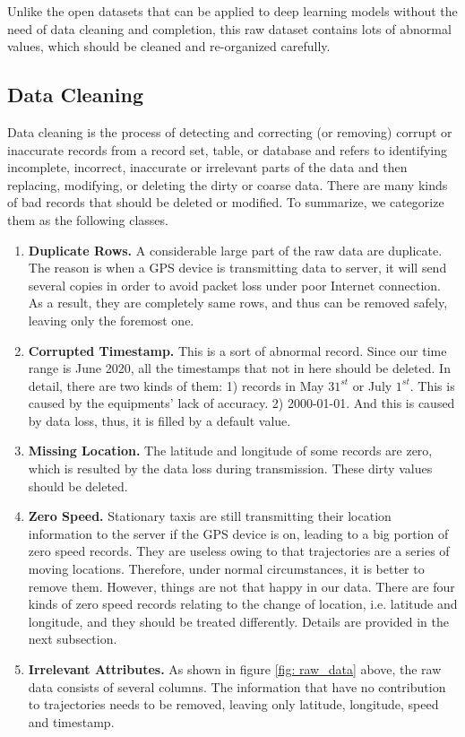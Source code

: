 Unlike the open datasets that can be applied to deep learning models without the need of data cleaning and completion, this raw dataset contains lots of abnormal values, which should be cleaned and re-organized carefully.

\subsection{Data Cleaning}
Data cleaning is the process of detecting and correcting (or removing) corrupt or inaccurate records from a record set, table, or database and refers to identifying incomplete, incorrect, inaccurate or irrelevant parts of the data and then replacing, modifying, or deleting the dirty or coarse data\cite{data_cleaning}. There are many kinds of bad records that should be deleted or modified. To summarize, we categorize them as the following classes.

\begin{enumerate}
  \item \textbf{Duplicate Rows.} A considerable large part of the raw data are duplicate. The reason is when a GPS device is transmitting data to server, it will send several copies in order to avoid packet loss under poor Internet connection. As a result, they are completely same rows, and thus can be removed safely, leaving only the foremost one.
  \item \textbf{Corrupted Timestamp.} This is a sort of abnormal record. Since our time range is June 2020, all the timestamps that not in here should be deleted. In detail, there are two kinds of them: 1) records in May $31^{st}$ or July $1^{st}$. This is caused by the equipments' lack of accuracy. 2) 2000-01-01. And this is caused by data loss, thus, it is filled by a default value.
  \item \textbf{Missing Location.} The latitude and longitude of some records are zero, which is resulted by the data loss during transmission. These dirty values should be deleted.
  \item \textbf{Zero Speed.} Stationary taxis are still transmitting their location information to the server if the GPS device is on, leading to a big portion of zero speed records. They are useless owing to that trajectories are a series of moving locations. Therefore, under normal circumstances, it is better to remove them. However, things are not that happy in our data. There are four kinds of zero speed records relating to the change of location, i.e. latitude and longitude, and they should be treated differently. Details are provided in the next subsection.
  \item \textbf{Irrelevant Attributes.} As shown in figure \ref{fig: raw_data} above, the raw data consists of several columns. The information that have no contribution to trajectories needs to be removed, leaving only latitude, longitude, speed and timestamp.
\end{enumerate}

